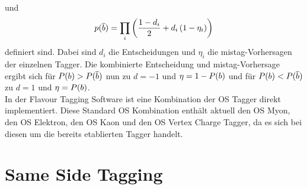 und
\begin{equation}
p({\overline {{b}}})=\prod_{i}\left(\frac{1-d_i}{2}+d_i\left(1-\eta_i\right)\right)
\end{equation}
definiert sind. Dabei sind $d_i$ die Entscheidungen und $\eta_i$ die mistag-Vorhersagen der einzelnen Tagger. Die kombinierte Entscheidung und mistag-Vorhersage ergibt sich für $P({b})>P({\overline {{b}}})$ nun zu $d=-1$ und $\eta=1-P({b})$ und für $P({b})<P({\overline {{b}}})$ zu $d=1$ und $\eta=P({b})$.\\
In der Flavour Tagging Software ist eine Kombination der OS Tagger direkt implementiert. Diese Standard OS Kombination enthält aktuell den OS Myon, den OS Elektron, den OS Kaon und den OS Vertex Charge Tagger, da es sich bei diesen um die bereits etablierten Tagger handelt.

\section{Same Side Tagging}

